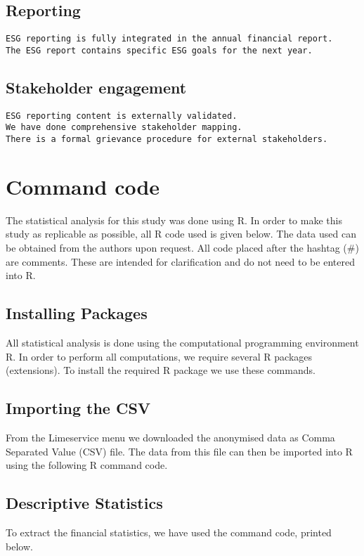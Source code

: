 \documentclass[twoside,12pt]{report}
\begin{document}
\subsection{Reporting}
\begin{lstlisting}
ESG reporting is fully integrated in the annual financial report.
The ESG report contains specific ESG goals for the next year.
\end{lstlisting}

\subsection{Stakeholder engagement}
\begin{lstlisting}
ESG reporting content is externally validated.
We have done comprehensive stakeholder mapping.
There is a formal grievance procedure for external stakeholders.
\end{lstlisting}


\newpage
\section{Command code}
\label{app:commandcode}
\lstset{language=R}
The statistical analysis for this study was done using R. In order to make this study as replicable as possible, all R code used is given below. The data used can be obtained from the authors upon request. All code placed after the hashtag (\#) are comments. These are intended for clarification and do not need to be entered into R.

\subsection{Installing Packages}
All statistical analysis is done using the computational programming environment R. In order to perform all computations, we require several R packages (extensions). To install the required R package we use these commands.


\subsection{Importing the CSV}
From the Limeservice menu we downloaded the anonymised data as Comma Separated Value (CSV) file. The data from this file can then be imported into R using the following R command code.


\subsection{Descriptive Statistics}
To extract the financial statistics, we have used the command code, printed below.

\end{document}
